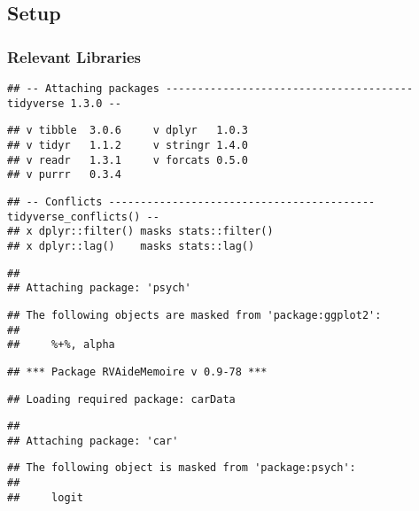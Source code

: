 \documentclass[
]{article}
\begin{document}
\hypertarget{setup}{%
\subsection{Setup}\label{setup}}

\hypertarget{relevant-libraries}{%
\subsubsection{Relevant Libraries}\label{relevant-libraries}}

\begin{verbatim}
## -- Attaching packages --------------------------------------- tidyverse 1.3.0 --
\end{verbatim}

\begin{verbatim}
## v tibble  3.0.6     v dplyr   1.0.3
## v tidyr   1.1.2     v stringr 1.4.0
## v readr   1.3.1     v forcats 0.5.0
## v purrr   0.3.4
\end{verbatim}

\begin{verbatim}
## -- Conflicts ------------------------------------------ tidyverse_conflicts() --
## x dplyr::filter() masks stats::filter()
## x dplyr::lag()    masks stats::lag()
\end{verbatim}

\begin{verbatim}
## 
## Attaching package: 'psych'
\end{verbatim}

\begin{verbatim}
## The following objects are masked from 'package:ggplot2':
## 
##     %+%, alpha
\end{verbatim}

\begin{verbatim}
## *** Package RVAideMemoire v 0.9-78 ***
\end{verbatim}

\begin{verbatim}
## Loading required package: carData
\end{verbatim}

\begin{verbatim}
## 
## Attaching package: 'car'
\end{verbatim}

\begin{verbatim}
## The following object is masked from 'package:psych':
## 
##     logit
\end{verbatim}
\end{document}
